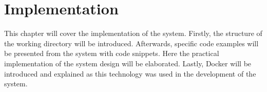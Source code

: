 \chapter{Implementation}\label{ch:implementation}
This chapter will cover the implementation of the system.
Firstly, the structure of the working directory will be introduced.
Afterwards, specific code examples will be presented from the system with code snippets.
Here the practical implementation of the system design will be elaborated.
Lastly, Docker will be introduced and explained as this technology was used in the development of the system.



